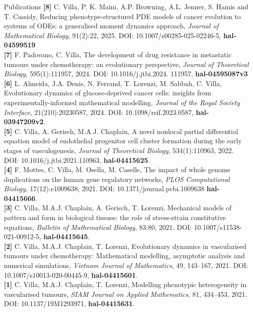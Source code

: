 \documentclass{resume} %
\begin{document}
\begin{rSection}{Publications}
{\bf [8]} C. Villa, P. K. Maini, A.P. Browning, A.L. Jenner, S. Hamis and T. Cassidy, Reducing phenotype-structured PDE models of cancer evolution to systems of ODEs: a generalised moment dynamics approach, \textit{Journal of Mathematical Biology}, 91(2):22, 2025. DOI: 10.1007/s00285-025-02246-5, \textbf{hal-04599519} \\
{\bf [7]} F.  Padovano, C. Villa, The development of drug resistance in metastatic tumours under chemotherapy: an evolutionary perspective, {\em Journal of Theoretical Biology}, 595(1):111957, 2024. DOI: 10.1016/j.jtbi.2024. 111957, \textbf{hal-04595087v3} \\
{\bf [6]} L. Almeida, J.A. Denis, N. Ferrand, T. Lorenzi, M. Sabbah, C. Villa, Evolutionary dynamics of glucose-deprived cancer cells: insights from experimentally-informed mathematical modelling, \textit{Journal of the Royal Society Interface}, 21(210):20230587,  2024. DOI: 10.1098/rsif.2023.0587, \textbf{hal-03947209v2}. \\
{\bf [5]} {C. Villa}, A. Gerisch, M.A.J. Chaplain, A novel nonlocal partial differential equation model of endothelial progenitor cell cluster formation during the early stages of vasculogenesis, {\em Journal of Theoretical Biology}, 534(1):110963, 2022. DOI:
10.1016/j.jtbi.2021.110963, \textbf{hal-04415625}. 
\\
{\bf [4]} F. Mottes, C. Villa, M. Osella, M. Caselle, The impact of whole genome duplications on the human gene regulatory networks, {\em PLOS Computational Biology}, 17(12):e1009638, 2021. DOI: 10.1371/journal.pcbi.1009638  \textbf{hal-04415666}.
 \\
{\bf [3]}  {C. Villa}, M.A.J. Chaplain, A. Gerisch, T. Lorenzi, {Mechanical models of pattern and form in biological tissues: the role of stress-strain constitutive equations}, {\em Bulletin of Mathematical Biology}, 83:80, 2021. DOI: 10.1007/s11538-
021-00912-5, \textbf{hal-04415645}. 
\\
{\bf [2]} {C. Villa}, M.A.J. Chaplain, T. Lorenzi, {Evolutionary dynamics in vascularised tumours under chemotherapy: Mathematical modelling, asymptotic analysis and numerical simulations}, {\em Vietnam Journal of Mathematics}, 49, 143–167, 2021. DOI: 10.1007/s10013-020-00445-9, \textbf{hal-04415601}. 
\\
{\bf [1]} {C. Villa}, M.A.J. Chaplain, T. Lorenzi, {Modelling phenotypic heterogeneity in vascularised tumours}, {\em SIAM Journal on Applied Mathematics}, 81, 434–453, 2021. DOI: 10.1137/19M1293971,  \textbf{hal-04415631}. 

\end{rSection}
\end{document}
